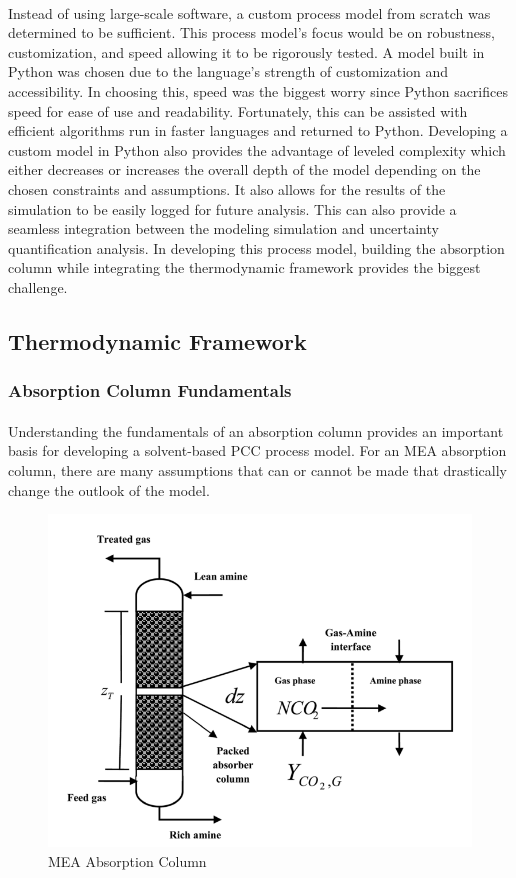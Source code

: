 \documentclass[12pt, letterpaper]{article}
\begin{document}
\paragraph{}
Instead of using large-scale software, a custom process model from scratch was determined to be sufficient. This process model's focus would be on robustness, customization, and speed allowing it to be rigorously tested. A model built in Python was chosen due to the language's strength of customization and accessibility. In choosing this, speed was the biggest worry since Python sacrifices speed for ease of use and readability. Fortunately, this can be assisted with efficient algorithms run in faster languages and returned to Python. Developing a custom model in Python also provides the advantage of leveled complexity which either decreases or increases the overall depth of the model depending on the chosen constraints and assumptions. It also allows for the results of the simulation to be easily logged for future analysis. This can also provide a seamless integration between the modeling simulation and uncertainty quantification analysis.  In developing this process model, building the absorption column while integrating the thermodynamic framework provides the biggest challenge.

\subsection{Thermodynamic Framework}

\subsubsection{Absorption Column Fundamentals}
\paragraph{}
Understanding the fundamentals of an absorption column provides an important basis for developing a solvent-based PCC process model. For an MEA absorption column, there are many assumptions that can or cannot be made that drastically change the outlook of the model. 

\begin{figure}[ht]
    \centering
    \includegraphics[width=12cm]{MEA_Absorption_Column}
    \caption{MEA Absorption Column}
\end{figure}
\end{document}
